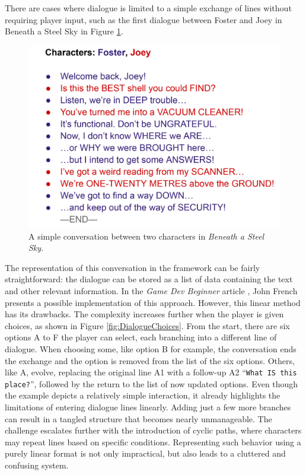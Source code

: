 There are cases where dialogue is limited to a simple exchange of lines without requiring player input, such as the first dialogue between Foster and Joey in Beneath a Steel Sky in Figure \ref{fig:DialogueSimple}. 

\begin{figure}[H]
\centering
\includegraphics[width=.6\linewidth]{img/dialogueSimple.png}
\caption{A simple conversation between two characters in \textit{Beneath a Steel Sky}.}
\label{fig:DialogueSimple}
\end{figure}

The representation of this conversation in the framework can be fairly straightforward: the dialogue can be stored as a list of data containing the text and other relevant information. In the \textit{Game Dev Beginner} article \cite{Dialogue-French}, John French presents a possible implementation of this approach. However, this linear method has its drawbacks. The complexity increases further when the player is given choices, as shown in Figure \ref{fig:DialogueChoices}. From the start, there are six options A to F the player can select, each branching into a different line of dialogue. When choosing some, like option B for example, the conversation ends the exchange and the option is removed from the list of the six options.  Others, like A, evolve, replacing the original line A1 with a follow-up A2 “\texttt{What IS this place?}”, followed by the return to the list of now updated options. Even though the example depicts a relatively simple interaction, it already highlights the limitations of entering dialogue lines linearly. Adding just a few more branches can result in a tangled structure that becomes nearly unmanageable. The challenge escalates further with the introduction of cyclic paths, where characters may repeat lines based on specific conditions. Representing such behavior using a purely linear format is not only impractical, but also leads to a cluttered and confusing system.

